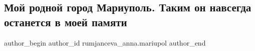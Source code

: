  
 
 
 
 

\subsection{Мой родной город Мариуполь. Таким он навсегда останется в моей памяти}
\label{sec:24_02_2023.fb.rumjanceva_anna.mariupol.1.moi_rodnoi_gorod_mar}

\ifcmt
 author_begin
   author_id rumjanceva_anna.mariupol
 author_end
\fi
